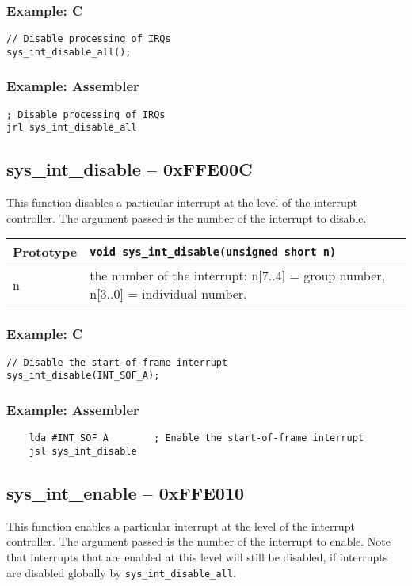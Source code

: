\subsubsection*{Example: C}
\begin{lstlisting}
// Disable processing of IRQs
sys_int_disable_all();
\end{lstlisting}

\subsubsection*{Example: Assembler}
\begin{verbatim}
; Disable processing of IRQs
jrl sys_int_disable_all
\end{verbatim}

\subsection*{sys\_int\_disable -- 0xFFE00C}
This function disables a particular interrupt at the level of the interrupt controller. The argument passed is the number of the interrupt to disable.

\bigskip

\begin{tabular}{|l||l|} \hline
Prototype & \lstinline!void sys_int_disable(unsigned short n)! \\ \hline
n & the number of the interrupt: n[7..4] = group number, n[3..0] = individual number. \\ \hline
\end{tabular}

\subsubsection*{Example: C}
\begin{lstlisting}
// Disable the start-of-frame interrupt
sys_int_disable(INT_SOF_A);
\end{lstlisting}

\subsubsection*{Example: Assembler}
\begin{verbatim}
    lda #INT_SOF_A        ; Enable the start-of-frame interrupt
    jsl sys_int_disable
\end{verbatim}

\subsection*{sys\_int\_enable -- 0xFFE010}
This function enables a particular interrupt at the level of the interrupt controller. The argument passed is the number of the interrupt to enable. Note that interrupts that are enabled at this level will still be disabled, if interrupts are disabled globally by \verb+sys_int_disable_all+.

